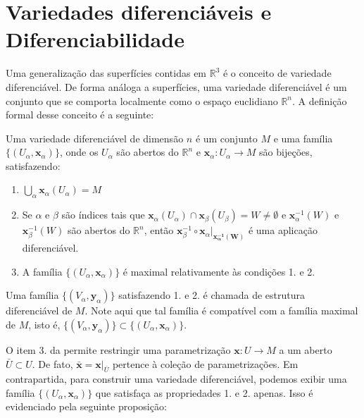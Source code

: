 	\section{Variedades diferenciáveis e Diferenciabilidade}
	\label{sec:variedades-diferenciaveis}
	Uma generalização das superfícies contidas em $\mathbb{R}^{3}$ é o conceito de variedade diferenciável. De forma análoga a superfícies, uma variedade diferenciável é um conjunto que se comporta localmente como o espaço euclidiano $\mathbb{R}^{n}$. A definição formal desse conceito é a seguinte:
	\begin{definition}
		\label{def:variedade-diferenciavel}
		Uma variedade diferenciável de dimensão $n$ é um conjunto $M$ e uma família $\{ (U_{\alpha}, \mathbf{x}_{\alpha}) \}$, onde os $U_{\alpha}$ são abertos do $\mathbb{R}^{n}$ e $\mathbf{x}_{\alpha}:U_{\alpha}\to M$ são bijeções, satisfazendo:
		\begin{enumerate}
			\item $\displaystyle \bigcup_{\alpha} \mathbf{x}_{\alpha}(U_{\alpha})=M$
			\item Se $\alpha$ e $\beta$ são índices tais que $\mathbf{x}_{\alpha}(U_{\alpha})\cap \mathbf{x}_{\beta}(U_{\beta}) = W \neq \emptyset$ e $\mathbf{x}^{-1}_{\alpha}(W)$ e $\mathbf{x}^{-1}_{\beta}(W)$ são abertos do $\mathbb{R}^{n}$, então $\mathbf{x}_{\beta}^{-1} \circ\mathbf{x}_{\alpha}|_{\mathbf{x_{\alpha}^{-1}(W)}}$ é uma aplicação diferenciável.
			\item A família $\{ (U_{\alpha}, \mathbf{x}_{\alpha}) \}$ é maximal relativamente às condições 1. e 2.
		\end{enumerate}

		Uma família $\{ (V_{\alpha}, \mathbf{y}_{\alpha}) \}$ satisfazendo 1. e 2. é chamada de estrutura diferenciável de $M$. Note aqui que tal família é compatível com a família maximal de $M$, isto é, $\{ (V_{\alpha}, \mathbf{y}_{\alpha}) \} \subset\{ (U_{\alpha}, \mathbf{x}_{\alpha}) \}$.


	\end{definition}
	O item 3. da  permite restringir uma parametrização $\mathbf{x}:U\to M$ a um aberto $\bar{U}\subset U$. De fato,  $\bar{\mathbf{x}}=\mathbf{x}|_{\overline{U}}$ pertence à coleção de parametrizações. Em contrapartida, para construir uma variedade diferenciável, podemos exibir uma família $\{ (U_{\alpha}, \mathbf{x}_{\alpha}) \}$ que satisfaça as propriedades 1. e 2. apenas. Isso é evidenciado pela seguinte proposição:
